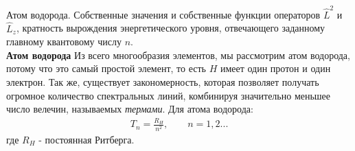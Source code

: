 \documentclass[__main__.tex]{subfiles}
\begin{document}
Атом водорода. Собственные значения и собственные функции операторов $\hat{L}^2$ и $\hat{L}_z$, кратность вырождения энергетического уровня, отвечающего заданному главному квантовому числу $n$.\\ 

\textbf{Атом водорода}
Из всего многообразия элементов, мы рассмотрим атом водорода, потому что это самый простой элемент, то есть $H$ имеет один протон и один электрон. Так же, существует закономерность, которая позволяет получать огромное количество спектральных линий, комбинируя значительно меньшее число велечин, называемых \textit{термами}. Для атома водорода:\\
\begin{gather}
T_n = \frac{R_H}{n^2}, \qquad n=1,2...
\end{gather}
где $R_H$ - постоянная Ритберга.\\

\end{document}
